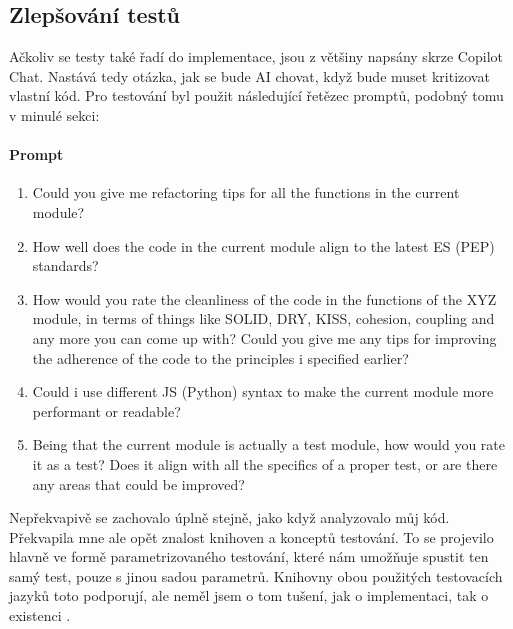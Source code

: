 \documentclass[FM,DP]{tulthesis}
\begin{document}
		\subsection{Zlepšování testů}
		Ačkoliv se testy také řadí do implementace, jsou z většiny napsány skrze Copilot Chat. Nastává tedy otázka, jak se bude AI chovat, když bude muset kritizovat vlastní kód. Pro testování byl použit následující řetězec promptů, podobný tomu v minulé sekci:
		
		\vspace{0.6em}
		\begin{tcolorbox}[colback=white,colframe=black]
			\paragraph{Prompt}
			\begin{enumerate}
				\item{Could you give me refactoring tips for all the functions in the current module?}
				\item{How well does the code in the current module align to the latest ES (PEP) standards?}
				\item{How would you rate the cleanliness of the code in the functions of the XYZ module, in terms of things like SOLID, DRY, KISS, cohesion, coupling and any more you can come up with? Could you give me any tips for improving the adherence of the code to the principles i specified earlier?}
				\item{Could i use different JS (Python) syntax to make the current module more performant or readable?}
				\item{Being that the current module is actually a test module, how would you rate it as a test? Does it align with all the specifics of a proper test, or are there any areas that could be improved?}
			\end{enumerate}
		\end{tcolorbox}
		
		Nepřekvapivě se zachovalo úplně stejně, jako když analyzovalo můj kód. Překvapila mne ale opět znalost knihoven a konceptů testování. To se projevilo hlavně ve formě parametrizovaného testování, které nám umožňuje spustit ten samý test, pouze s jinou sadou parametrů. Knihovny obou použitých testovacích jazyků toto podporují, ale neměl jsem o tom tušení, jak o implementaci, tak o existenci \cite{parametrized_testing_be} \cite{parametrized_testing_fe}.
		
\end{document}
